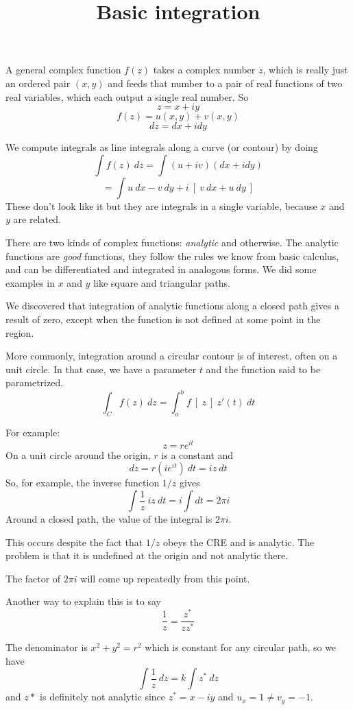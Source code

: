 \documentclass[11pt, oneside]{article}
\title{Basic integration}
\date{}
\begin{document}
\maketitle
\Large


A general complex function $f(z)$ takes a complex number $z$, which is really just an ordered pair $(x,y)$ and feeds that number to a pair of real functions of two real variables, which each output a single real number.  So
\[ z = x + iy \]
\[ f(z) = u(x,y) + v(x,y) \]
\[ dz = dx + i dy \]

We compute integrals as line integrals along a curve (or contour) by doing
\[ \int f(z) \ dz = \int (u + iv)(dx + i dy) \]
\[ = \int u \ dx - v \ dy + i \ [ \ v \ dx + u \ dy \ ] \]
These don't look like it but they are integrals in a single variable, because $x$ and $y$ are related.

There are two kinds of complex functions:  \emph{analytic} and otherwise.  The analytic functions are \emph{good} functions, they follow the rules we know from basic calculus, and can be differentiated and integrated in analogous forms.  We did some examples in $x$ and $y$ like square and triangular paths.

We discovered that integration of analytic functions along a closed path gives a result of zero, except when the function is not defined at some point in the region.

More commonly, integration around a circular contour is of interest, often on a unit circle.  In that case, we have a parameter $t$ and the function said to be parametrized.
\[ \int_C f(z) \ dz = \int_a^b f \ [ \ z \ ] \ z'(t) \ dt \]

For example:
\[ z = r e^{it} \]
On a unit circle around the origin, $r$ is a constant and
\[ dz = r(i e^{it}) \ dt = iz \ dt \]
So, for example, the inverse function $1/z$ gives
\[ \int \frac{1}{z} \ iz \ dt = i \int dt = 2 \pi i \]
Around a closed path, the value of the integral is $2 \pi i$.  

This occurs despite the fact that $1/z$ obeys the CRE and is analytic.  The problem is that it is undefined at the origin and not analytic there.

The factor of $2 \pi i$ will come up repeatedly from this point.

Another way to explain this is to say 
\[ \frac{1}{z} = \frac{z^*}{zz^*} \]

The denominator is $x^2 + y^2 = r^2$ which is constant for any circular path, so we have
\[ \int \frac{1}{z} \ dz = k \int z^* \ dz \]
and $z*$ is definitely not analytic since $z^* = x - iy$ and $u_x = 1 \ne v_y = -1$.
\end{document}
